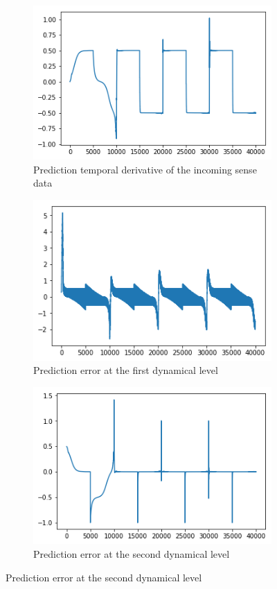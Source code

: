 \begin{figure}[H]
\bigskip
\begin{subfigure}{.32\linewidth}
 \centering
 \includegraphics[width=0.8\linewidth]{chapter_3_figures/sawtooth_predphidot.png}
 \caption{Prediction temporal derivative of the incoming sense data}
\end{subfigure}
\hfill
\begin{subfigure}{.32\linewidth}
 \centering
 \includegraphics[width=0.8\linewidth]{chapter_3_figures/sawtooth_pe1.png}
 \caption{Prediction error at the first dynamical level}
\end{subfigure}
\hfill
\begin{subfigure}{.32\linewidth}
 \centering
 \includegraphics[width=0.8\linewidth]{chapter_3_figures/sawtooth_pe2.png}
 \caption{Prediction error at the second dynamical level}
\end{subfigure}
 

\end{figure}
